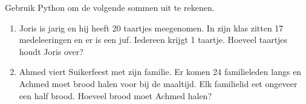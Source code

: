 Gebruik Python om de volgende sommen uit te rekenen.
\begin{enumerate}
	\item Joris is jarig en hij heeft 20 taartjes meegenomen. In zijn klas zitten 17 medeleeringen en er is een juf. Iedereen krijgt 1 taartje. Hoeveel taartjes houdt Joris over?
	\item Ahmed viert Suikerfeest met zijn familie. Er komen 24 familieleden langs en Achmed moet brood halen voor bij de maaltijd. Elk familielid eet ongeveer een half brood. Hoeveel brood moet Achmed halen?
\end{enumerate}
